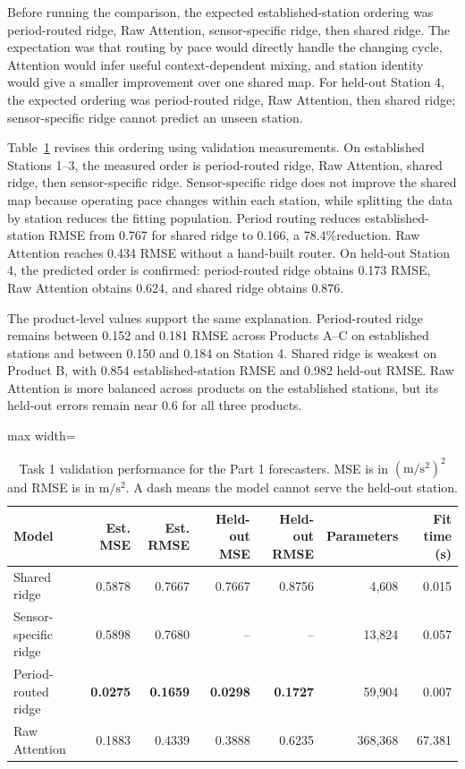 \documentclass{article}
\newcommand{\msq}{\ensuremath{\mathrm{m}/\mathrm{s}^{2}}}
\newcommand{\pct}{\%}
\begin{document}
Before running the comparison, the expected established-station ordering was period-routed ridge, Raw Attention, sensor-specific ridge, then shared ridge. The expectation was that routing by pace would directly handle the changing cycle, Attention would infer useful context-dependent mixing, and station identity would give a smaller improvement over one shared map. For held-out Station 4, the expected ordering was period-routed ridge, Raw Attention, then shared ridge; sensor-specific ridge cannot predict an unseen station.

Table~\ref{tab:t1-part1} revises this ordering using validation measurements. On established Stations 1--3, the measured order is period-routed ridge, Raw Attention, shared ridge, then sensor-specific ridge. Sensor-specific ridge does not improve the shared map because operating pace changes within each station, while splitting the data by station reduces the fitting population. Period routing reduces established-station RMSE from 0.767 for shared ridge to 0.166, a 78.4\pct reduction. Raw Attention reaches 0.434 RMSE without a hand-built router. On held-out Station 4, the predicted order is confirmed: period-routed ridge obtains 0.173 RMSE, Raw Attention obtains 0.624, and shared ridge obtains 0.876.

The product-level values support the same explanation. Period-routed ridge remains between 0.152 and 0.181 RMSE across Products A--C on established stations and between 0.150 and 0.184 on Station 4. Shared ridge is weakest on Product B, with 0.854 established-station RMSE and 0.982 held-out RMSE. Raw Attention is more balanced across products on the established stations, but its held-out errors remain near 0.6 for all three products.

\begin{table}[htbp]
\centering
\caption{Task 1 validation performance for the Part 1 forecasters. MSE is in $(\msq)^2$ and RMSE is in $\msq$. A dash means the model cannot serve the held-out station.}
\label{tab:t1-part1}
\footnotesize
\begin{adjustbox}{max width=\linewidth}
\begin{tabular}{lrrrrrr}
\toprule
Model & Est. MSE & Est. RMSE & Held-out MSE & Held-out RMSE & Parameters & Fit time (s) \\
\midrule
Shared ridge & 0.5878 & 0.7667 & 0.7667 & 0.8756 & 4,608 & 0.015 \\
Sensor-specific ridge & 0.5898 & 0.7680 & -- & -- & 13,824 & 0.057 \\
Period-routed ridge & \textbf{0.0275} & \textbf{0.1659} & \textbf{0.0298} & \textbf{0.1727} & 59,904 & 0.007 \\
Raw Attention & 0.1883 & 0.4339 & 0.3888 & 0.6235 & 368,368 & 67.381 \\
\bottomrule
\end{tabular}
\end{adjustbox}
\end{table}
\end{document}
